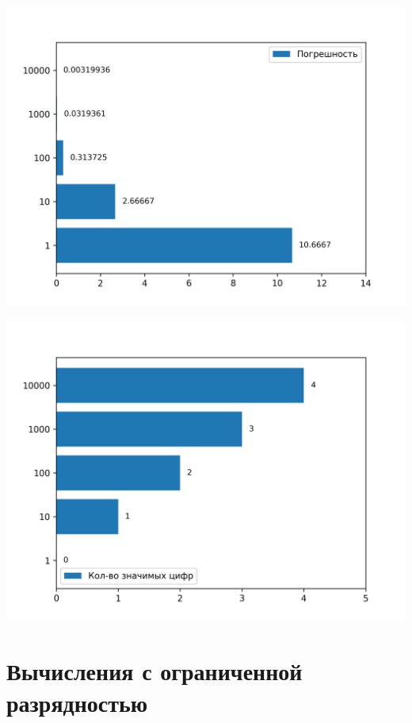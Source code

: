 \documentclass{article}
\begin{document}
\newpage
\begin{center}
\includegraphics[width=\textwidth]{plots/series_error.png}
\end{center}
\begin{center}
\includegraphics[width=\textwidth]{plots/series_n_digits.png}
\end{center}
\section{Вычисления с ограниченной разрядностью}
\end{document}
